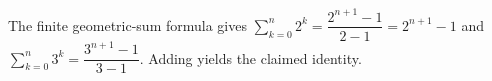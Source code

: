 The finite geometric-sum formula gives $\sum_{k=0}^n2^k=\dfrac{2^{n+1}-1}{2-1}=2^{n+1}-1$ and $\sum_{k=0}^n3^k=\dfrac{3^{n+1}-1}{3-1}$. Adding yields the claimed identity.
